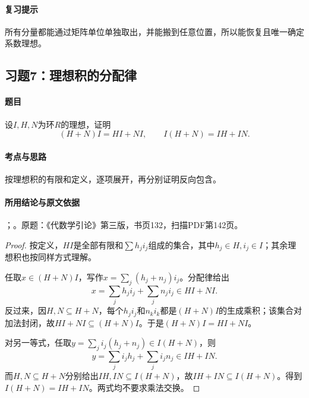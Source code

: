 \paragraph{复习提示}

所有分量都能通过矩阵单位单独取出，并能搬到任意位置，所以能恢复且唯一确定系数理想。



\subsection{习题7：理想积的分配律}

\label{ex:3:7}

\paragraph{题目}

设$I,H,N$为环$R$的理想，证明
\[
(H+N)I=HI+NI,\qquad I(H+N)=IH+IN.
\]

\paragraph{考点与思路}

按理想积的有限和定义，逐项展开，再分别证明反向包含。

\paragraph{所用结论与原文依据}

；。原题：《代数学引论》第三版，书页132，扫描PDF第142页。


\begin{proof}

按定义，$HI$是全部有限和$\sum h_ji_j$组成的集合，其中$h_j\in H,i_j\in I$；其余理想积也按同样方式理解。

任取$x\in(H+N)I$，写作$x=\sum_j(h_j+n_j)i_j$。分配律给出
\[
x=\sum_jh_ji_j+\sum_jn_ji_j\in HI+NI.
\]
反过来，因$H,N\subseteq H+N$，每个$h_ji_j$和$n_ki_k$都是$(H+N)I$的生成乘积；该集合对加法封闭，故$HI+NI\subseteq(H+N)I$。于是$(H+N)I=HI+NI$。

对另一等式，任取$y=\sum_ji_j(h_j+n_j)\in I(H+N)$，则
\[
y=\sum_ji_jh_j+\sum_ji_jn_j\in IH+IN.
\]
而$H,N\subseteq H+N$分别给出$IH,IN\subseteq I(H+N)$，故$IH+IN\subseteq I(H+N)$。得到$I(H+N)=IH+IN$。两式均不要求乘法交换。

\end{proof}

